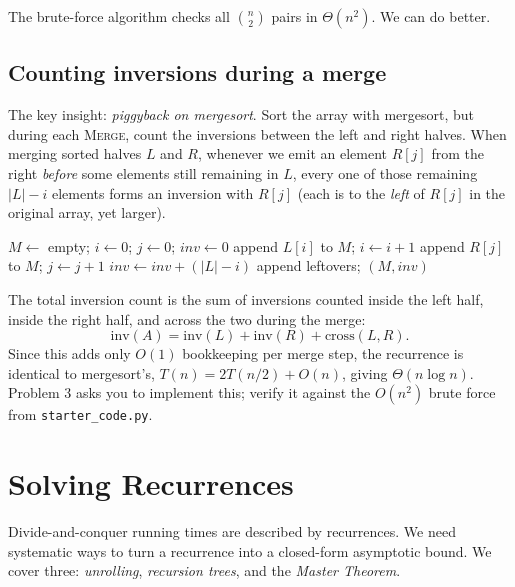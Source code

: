 \documentclass[11pt]{article}
\begin{document}
The brute-force algorithm checks all $\binom{n}{2}$ pairs in $\Theta(n^2)$. We can do
better.

\subsection{Counting inversions during a merge}

The key insight: \emph{piggyback on mergesort}. Sort the array with mergesort, but during
each \textsc{Merge}, count the inversions between the left and right halves. When merging
sorted halves $L$ and $R$, whenever we emit an element $R[j]$ from the right \emph{before}
some elements still remaining in $L$, every one of those remaining $|L| - i$ elements forms
an inversion with $R[j]$ (each is to the \emph{left} of $R[j]$ in the original array, yet
larger).

\begin{algorithm}[h]
\caption{Merge-and-count}
\begin{algorithmic}[1]
 
    \State $M \gets$ empty; $i \gets 0$; $j \gets 0$; $\mathit{inv} \gets 0$
            \State append $L[i]$ to $M$; $i \gets i + 1$
        \Else
            \State append $R[j]$ to $M$; $j \gets j + 1$
            \State $\mathit{inv} \gets \mathit{inv} + (|L| - i)$ 
        \EndIf
    \EndWhile
    \State append leftovers; \Return $(M, \mathit{inv})$
\EndFunction
\end{algorithmic}
\end{algorithm}

The total inversion count is the sum of inversions counted inside the left half, inside the
right half, and across the two during the merge:
\[
    \mathrm{inv}(A) = \mathrm{inv}(L) + \mathrm{inv}(R) + \mathrm{cross}(L, R).
\]
Since this adds only $O(1)$ bookkeeping per merge step, the recurrence is identical to
mergesort's, $T(n) = 2T(n/2) + O(n)$, giving $\Theta(n \log n)$. Problem 3 asks you to
implement this; verify it against the $O(n^2)$ brute force from \texttt{starter\_code.py}.

\section{Solving Recurrences}
\label{sec:recurrences}

Divide-and-conquer running times are described by recurrences. We need systematic ways to
turn a recurrence into a closed-form asymptotic bound. We cover three: \emph{unrolling},
\emph{recursion trees}, and the \emph{Master Theorem}.
\end{document}
